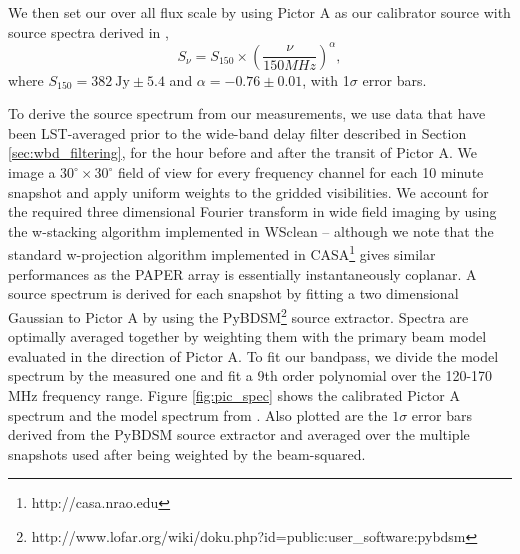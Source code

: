 \documentclass[twocolumn,numberedappendix]{emulateapj} \shorttitle{New Limits on the 21 cm Power Spectrum at $z=8.4$}
\begin{document}
We then set our over all flux scale by using Pictor A as our calibrator source
with source spectra derived in \citet{jacobs_et_al2013}, 
\begin{equation}
    S_{\nu} = S_{150}\times\left(\frac{\nu}{150MHz}\right)^{\alpha},
\end{equation}
where $S_{150} = 382~\text{Jy} \pm 5.4$ and $\alpha = -0.76 \pm 0.01$, with
1$\sigma$ error bars.



To derive the source spectrum from our measurements, we use data that have been
LST-averaged prior to the wide-band delay filter described in Section
\ref{sec:wbd_filtering}, for the hour before and after the transit of Pictor A.
We image a $30^\circ \times 30^\circ$ field of view for every frequency channel
for each 10 minute snapshot and apply uniform weights to the gridded
visibilities. We account for the required three dimensional Fourier transform in
wide field imaging by using the w-stacking algorithm implemented in WSclean
\citep{offringa_et_al2014} – although we note that the standard w-projection
algorithm implemented in CASA\footnote{http://casa.nrao.edu} gives similar
performances as the PAPER array is essentially instantaneously coplanar.  A
source spectrum is derived for each snapshot by fitting a two dimensional
Gaussian to Pictor A by using the
PyBDSM\footnote{http://www.lofar.org/wiki/doku.php?id=public:user\_software:pybdsm}
source extractor. Spectra are optimally averaged together by weighting them with
the primary beam model evaluated in the direction of Pictor A. To fit our
bandpass, we divide the model spectrum by the measured one and fit a 9th order
polynomial over the 120-170 MHz frequency range. Figure \ref{fig:pic_spec} shows
the calibrated Pictor A spectrum and the model spectrum from
\citet{jacobs_et_al2013}. Also plotted are the $1\sigma$ error bars derived from the PyBDSM source extractor and averaged over the multiple snapshots used after being weighted by the beam-squared.
\end{document}
